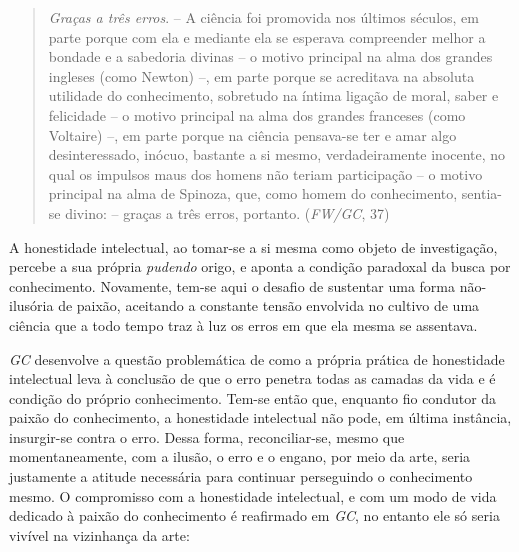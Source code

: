 \documentclass[
	12pt,				%
	openright,			%
	oneside,			%
	a4paper,			%
	english,			%
	french,				%
	spanish,			%
	brazil				%
	]{abntex2}
\begin{document}
\begin{quotation}
\textit{Graças a três erros}. – A ciência foi promovida nos últimos séculos, em parte porque com ela e mediante ela se esperava compreender melhor a bondade e a sabedoria divinas – o motivo principal na alma dos grandes ingleses (como Newton) –, em parte porque se acreditava na absoluta utilidade do conhecimento, sobretudo na íntima ligação de moral, saber e felicidade – o motivo principal na alma dos grandes franceses (como Voltaire) –, em parte porque na ciência pensava-se ter e amar algo desinteressado, inócuo, bastante a si mesmo, verdadeiramente inocente, no qual os impulsos maus dos homens não teriam participação – o motivo principal na alma de Spinoza, que, como homem do conhecimento, sentia-se divino: – graças a três erros, portanto. (\textit{FW/GC}, 37)
\end{quotation}

A honestidade intelectual, ao tomar-se a si mesma como objeto de investigação, percebe a sua própria \textit{pudendo} origo, e aponta a condição paradoxal da busca por conhecimento. Novamente, tem-se aqui o desafio de sustentar uma forma não-ilusória de paixão, aceitando a constante tensão envolvida no cultivo de uma ciência que a todo tempo traz à luz os erros em que ela mesma se assentava. 

	\textit{GC} desenvolve a questão problemática de como a própria prática de honestidade intelectual leva à conclusão de que o erro penetra todas as camadas da vida e é condição do próprio conhecimento. Tem-se então que, enquanto fio condutor da paixão do conhecimento, a honestidade intelectual não pode, em última instância, insurgir-se contra o erro. Dessa forma, reconciliar-se, mesmo que momentaneamente, com a ilusão, o erro e o engano, por meio da arte, seria justamente a atitude necessária para continuar perseguindo o conhecimento mesmo. O compromisso com a honestidade intelectual, e com um modo de vida dedicado à paixão do conhecimento é reafirmado em \textit{GC}, no entanto ele só seria vivível na vizinhança da arte:
\end{document}
